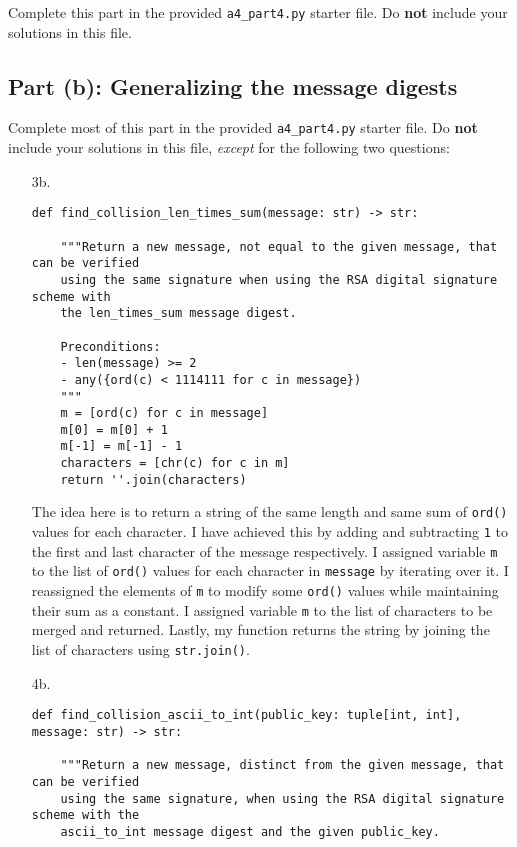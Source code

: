 \documentclass[11pt]{article}
\begin{document}
Complete this part in the provided \texttt{a4\_part4.py} starter file.
Do \textbf{not} include your solutions in this file.

\subsection*{Part (b): Generalizing the message digests}

Complete most of this part in the provided \texttt{a4\_part4.py} starter file.
Do \textbf{not} include your solutions in this file, \emph{except} for the following two questions:

\begin{enumerate}

\item[3b.]

\begin{verbatim}
def find_collision_len_times_sum(message: str) -> str:

    """Return a new message, not equal to the given message, that can be verified 
    using the same signature when using the RSA digital signature scheme with 
    the len_times_sum message digest.

    Preconditions:
    - len(message) >= 2
    - any({ord(c) < 1114111 for c in message})
    """
    m = [ord(c) for c in message]
    m[0] = m[0] + 1
    m[-1] = m[-1] - 1
    characters = [chr(c) for c in m]
    return ''.join(characters)
\end{verbatim}

The idea here is to return a string of the same length and same sum of \texttt{ord()} values for each character. I have achieved this by adding and subtracting \texttt{1} to the first and last character of the message respectively. I assigned variable \texttt{m} to the list of \texttt{ord()} values for each character in \texttt{message} by iterating over it. I reassigned the elements of \texttt{m} to modify some \texttt{ord()} values while maintaining their sum as a constant. I assigned variable \texttt{m} to the list of characters to be merged and returned. Lastly, my function returns the string by joining the list of characters using \texttt{str.join()}.


\newpage

\item[4b.]

\begin{verbatim}
def find_collision_ascii_to_int(public_key: tuple[int, int], message: str) -> str:

    """Return a new message, distinct from the given message, that can be verified 
    using the same signature, when using the RSA digital signature scheme with the 
    ascii_to_int message digest and the given public_key.


\end{verbatim}
\end{enumerate}
\end{document}
